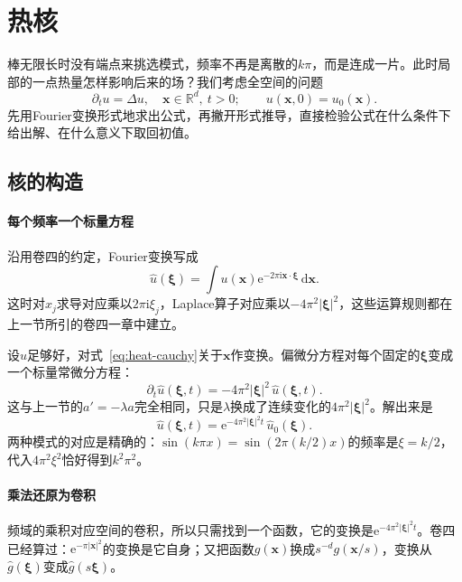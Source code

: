 \section{热核}
\label{sec:heat-kernel}

棒无限长时没有端点来挑选模式，频率不再是离散的$k\pi$，而是连成一片。此时局部的一点热量怎样影响后来的场？我们考虑全空间的问题
\begin{equation}
 \partial_tu=\Delta u,\quad \bm{x}\in\mathbb{R}^{d},\ t>0;\qquad u(\bm{x},0)=u_0(\bm{x}) .
 \label{eq:heat-cauchy}
\end{equation}
先用Fourier变换形式地求出公式，再撇开形式推导，直接检验公式在什么条件下给出解、在什么意义下取回初值。

\subsection{核的构造}
\label{sec:heat-kernel-construction}

\paragraph{每个频率一个标量方程}
沿用卷四的约定，Fourier变换写成
\[
 \widehat{u}(\bm{\xi})=\int u(\bm{x})\mathrm{e}^{-2\pi\mathrm{i}\bm{x}\cdot\bm{\xi}}\,\mathrm{d}\bm{x} .
\]
这时对$x_j$求导对应乘以$2\pi\mathrm{i}\xi_j$，Laplace算子对应乘以$-4\pi^2\lvert\bm{\xi}\rvert^2$，这些运算规则都在上一节所引的卷四一章中建立。

设$u$足够好，对式~\eqref{eq:heat-cauchy}关于$\bm{x}$作变换。偏微分方程对每个固定的$\bm{\xi}$变成一个标量常微分方程：
\[
 \partial_t\widehat{u}(\bm{\xi},t)=-4\pi^2\lvert\bm{\xi}\rvert^2\,\widehat{u}(\bm{\xi},t) .
\]
这与上一节的$a'=-\lambda a$完全相同，只是$\lambda$换成了连续变化的$4\pi^2\lvert\bm{\xi}\rvert^2$。解出来是
\begin{equation}
 \widehat{u}(\bm{\xi},t)=\mathrm{e}^{-4\pi^2\lvert\bm{\xi}\rvert^2t}\,\widehat{u}_0(\bm{\xi}) .
 \label{eq:heat-fourier-solution}
\end{equation}
两种模式的对应是精确的：$\sin(k\pi x)=\sin(2\pi(k/2)x)$的频率是$\xi=k/2$，代入$4\pi^2\xi^2$恰好得到$k^2\pi^2$。

\paragraph{乘法还原为卷积}
频域的乘积对应空间的卷积，所以只需找到一个函数，它的变换是$\mathrm{e}^{-4\pi^2\lvert\bm{\xi}\rvert^2t}$。卷四已经算过：$\mathrm{e}^{-\pi\lvert\bm{x}\rvert^2}$的变换是它自身；又把函数$g(\bm{x})$换成$s^{-d}g(\bm{x}/s)$，变换从$\widehat{g}(\bm{\xi})$变成$\widehat{g}(s\bm{\xi})$。

